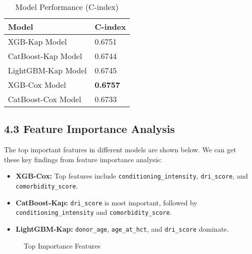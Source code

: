 \documentclass[11pt]{article}
\begin{document}
\begin{table}[h!]
\centering
\caption{Model Performance (C-index)}
\begin{tabular}{ll}
\toprule
Model & C-index \\
\midrule
XGB-Kap Model & 0.6751 \\
CatBoost-Kap Model & 0.6744 \\
LightGBM-Kap Model & 0.6745 \\
XGB-Cox Model & \textbf{0.6757} \\
CatBoost-Cox Model & 0.6733 \\
\bottomrule
\end{tabular}
\end{table}

\subsection*{4.3 Feature Importance Analysis}
The top important features in different models are shown below. We can get these key findings from feature importance analysis:

\begin{itemize}
  \item \textbf{XGB-Cox:} Top features include \texttt{conditioning\_intensity}, \texttt{dri\_score}, and \texttt{comorbidity\_score}.
  \item \textbf{CatBoost-Kap:} \texttt{dri\_score} is most important, followed by \texttt{conditioning\_intensity} and \texttt{comorbidity\_score}.
  \item \textbf{LightGBM-Kap:} \texttt{donor\_age}, \texttt{age\_at\_hct}, and \texttt{dri\_score} dominate.
\end{itemize}

\begin{figure}[htbp]
    \centering
    \label{fig:twoimages}
\end{figure}

\begin{figure}[htbp]
    \centering
    \caption{Top Importance Features}
    \label{fig:threeimages}
\end{figure}
\end{document}
